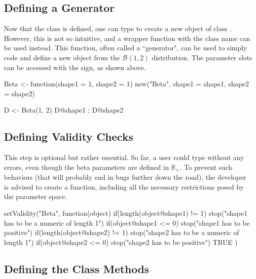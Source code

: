 \documentclass[nojss]{jss}
\newcommand{\fct}[1]{\code{#1()}}
\begin{document}
\subsection[Defining a Generator]{Defining a Generator}

Now that the class is defined, one can type  to create a new object of class . However, this is not so intuitive, and a wrapper function with the class name can be used instead. This function, often called a ``generator", can be used to simply code  and define a new object from the $\mathcal{B}(1,2)$ distribution. The parameter slots can be accessed with the  sign, as shown above.

\begin{CodeChunk}
\begin{CodeInput}
Beta <- function(shape1 = 1, shape2 = 1) {
  new("Beta", shape1 = shape1, shape2 = shape2)
}

D <- Beta(1, 2)
D@shape1 ; D@shape2
\end{CodeInput}
\end{CodeChunk}

\subsection[Defining Validity Checks]{Defining Validity Checks}

This step is optional but rather essential. So far, a user could type  without any errors, even though the beta parameters are defined in $\mathbb{R}_{+}$. To prevent such behaviors (that will probably end in bugs further down the road), the developer is advised to create a \fct{setValidity} function, including all the necessary restrictions posed by the parameter space.

\begin{CodeChunk}
\begin{CodeInput}
setValidity("Beta", function(object) {
  if(length(object@shape1) != 1) {
    stop("shape1 has to be a numeric of length 1")
  }
  if(object@shape1 <= 0) {
    stop("shape1 has to be positive")
  }
  if(length(object@shape2) != 1) {
    stop("shape2 has to be a numeric of length 1")
  }
  if(object@shape2 <= 0) {
    stop("shape2 has to be positive")
  }
  TRUE
})
\end{CodeInput}
\end{CodeChunk}

\subsection[Defining the Class Methods]{Defining the Class Methods}
\end{document}
